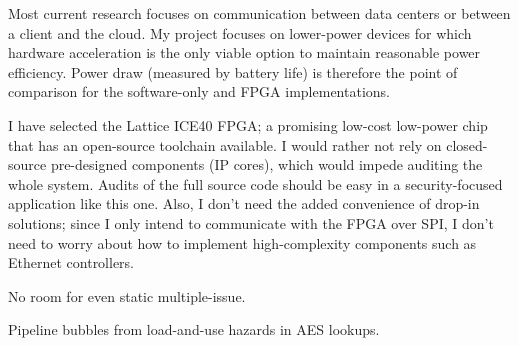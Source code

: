 Most current research focuses on communication between data centers or between a client and the cloud. My project focuses on lower-power devices for which hardware acceleration is the only viable option to maintain reasonable power efficiency. Power draw (measured by battery life) is therefore the point of comparison for the software-only and FPGA implementations.

I have selected the Lattice ICE40 FPGA; a promising low-cost low-power chip that has an open-source toolchain available. I would rather not rely on closed-source pre-designed components (IP cores), which would impede auditing the whole system. Audits of the full source code should be easy in a security-focused application like this one. Also, I don't need the added convenience of drop-in solutions; since I only intend to communicate with the FPGA over SPI, I don't need to worry about how to implement high-complexity components such as Ethernet controllers.

No room for even static multiple-issue.

Pipeline bubbles from load-and-use hazards in AES lookups.

